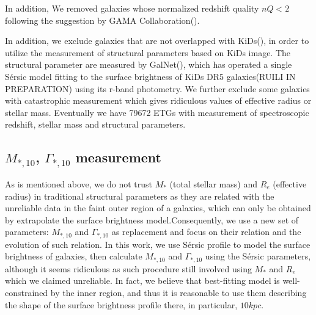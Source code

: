 \documentclass[fleqn,usenatbib]{mnras}
\begin{document}
 In addition, We removed galaxies whose normalized redshift quality $nQ < 2$ following the suggestion by GAMA Collaboration(\citep{GAMAmain}).
\par In addition, we exclude galaxies that are not overlapped with KiDs(\cite{kuijken_fourth_2019}), in order to utilize the measurement of structural parameters based on KiDs image. 
The structural parameter are measured by GalNet(\cite{GaLNet2022}), which has operated a single S\'{e}rsic model fitting to the surface brightness of  KiDs DR5 galaxies(RUILI IN PREPARATION) using its r-band photometry.
 We further exclude some galaxies with catastrophic measurement which gives ridiculous values of effective radius or stellar mass. Eventually we have 79672 ETGs with measurement of spectroscopic redshift, stellar mass and structural parameters.  
\subsection{$M_{*,10}$, $\Gamma_{*,10}$ measurement}
As is mentioned above, we do not trust $M_*$ (total stellar mass) and $R_e$ (effective radius) in traditional structural parameters as they are related with the unreliable data in the faint outer region of a galaxies, which can only be obtained by extrapolate the surface brightness model.Consequently, we use a new set of parameters: $M_{*,10}$ and $\Gamma_{*,10}$ as replacement and focus on their relation and the evolution of such relation. In this work, we use S\'{e}rsic profile to model the surface brightness of galaxies, then calculate $M_{*,10}$ and $\Gamma_{*,10}$ using the S\'{e}rsic parameters, although it seems ridiculous as such procedure still involved using $M_*$ and $R_e$ which we claimed unreliable. In fact, we believe that best-fitting model is well-constrained by the inner region, and thus it is reasonable to use them describing the shape of the surface brightness profile there, in particular, $10kpc$.
\end{document}
